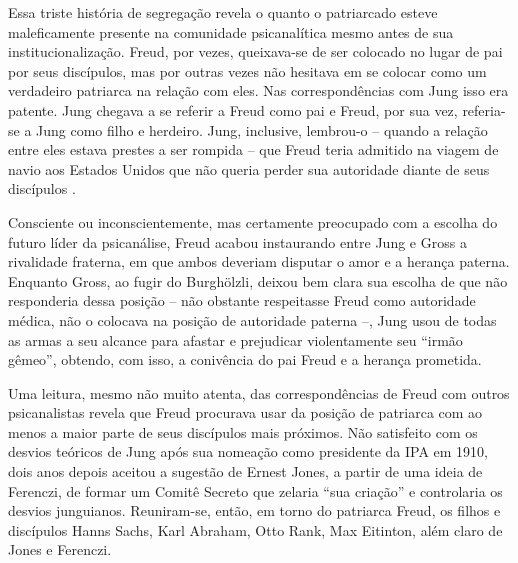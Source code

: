 Essa triste história de segregação revela o quanto o patriarcado esteve
maleficamente presente na comunidade psicanalítica mesmo antes de sua
institucionalização. Freud, por vezes, queixava-se de ser colocado no
lugar de pai por seus discípulos, mas por outras vezes não hesitava em
se colocar como um verdadeiro patriarca na relação com eles. Nas
correspondências com Jung isso era patente. Jung chegava a se referir a
Freud como pai e Freud, por sua vez, referia-se a Jung como filho e
herdeiro. Jung, inclusive, lembrou-o -- quando a relação entre eles
estava prestes a ser rompida -- que Freud teria admitido na viagem de
navio aos Estados Unidos que não queria perder sua autoridade diante de
seus discípulos .

Consciente ou inconscientemente, mas certamente preocupado com a escolha
do futuro líder da psicanálise, Freud acabou instaurando entre Jung e
Gross a rivalidade fraterna, em que ambos deveriam disputar o amor e a
herança paterna. Enquanto Gross, ao fugir do Burghölzli, deixou bem
clara sua escolha de que não responderia dessa posição -- não obstante
respeitasse Freud como autoridade médica, não o colocava na posição de
autoridade paterna --, Jung usou de todas as armas a seu alcance para
afastar e prejudicar violentamente seu ``irmão gêmeo'', obtendo, com
isso, a conivência do pai Freud e a herança prometida.

Uma leitura, mesmo não muito atenta, das correspondências de Freud com
outros psicanalistas revela que Freud procurava usar da posição de
patriarca com ao menos a maior parte de seus discípulos mais próximos.
Não satisfeito com os desvios teóricos de Jung após sua nomeação como
presidente da IPA em 1910, dois anos depois aceitou a sugestão de Ernest
Jones, a partir de uma ideia de Ferenczi, de formar um Comitê Secreto
que zelaria ``sua criação'' e controlaria os desvios junguianos.
Reuniram-se, então, em torno do patriarca Freud, os filhos e discípulos
Hanns Sachs, Karl Abraham, Otto Rank, Max Eitinton, além claro de Jones
e Ferenczi.

